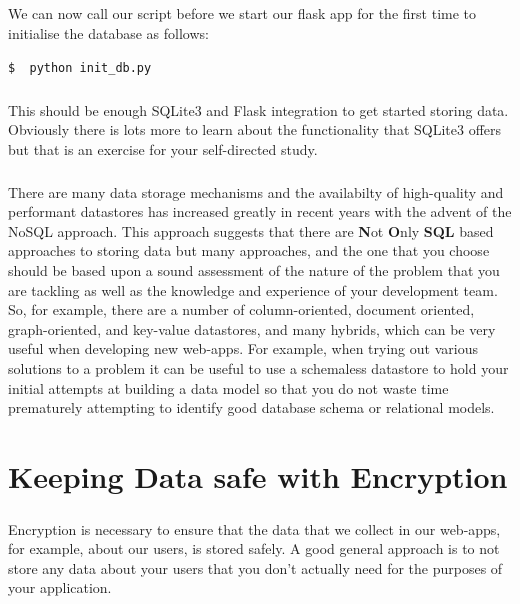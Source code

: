 \documentclass[12pt, a4paper, twoside]{book}
\begin{document}
\paragraph{} We can now call our script before we start our flask app for the first time to initialise the database as follows:

\begin{lstlisting}[style=DOS]
$  python init_db.py
\end{lstlisting}

\paragraph{} This should be enough SQLite3 and Flask integration to get started storing data. Obviously there is lots more to learn about the functionality that SQLite3 offers but that is an exercise for your self-directed study.

\paragraph{} There are many data storage mechanisms and the availabilty of high-quality and performant datastores has increased greatly in recent years with the advent of the NoSQL approach. This approach suggests that there are {\bf{N}}ot {\bf{O}}nly {\bf{SQL}} based approaches to storing data but many approaches, and the one that you choose should be based upon a sound assessment of the nature of the problem that you are tackling as well as the knowledge and experience of your development team. So, for example, there are a number of column-oriented, document oriented, graph-oriented, and key-value datastores, and many hybrids, which can be very useful when developing new web-apps. For example, when trying out various solutions to a problem it can be useful to use a schemaless datastore to hold your initial attempts at building a data model so that you do not waste time prematurely attempting to identify good database schema or relational models. 


\chapter{Keeping Data safe with Encryption}
\label{lab09}
\paragraph{} Encryption is necessary to ensure that the data that we collect in our web-apps, for example, about our users, is stored safely. A good general approach is to not store any data about your users that you don't actually need for the purposes of your application.
\end{document}
